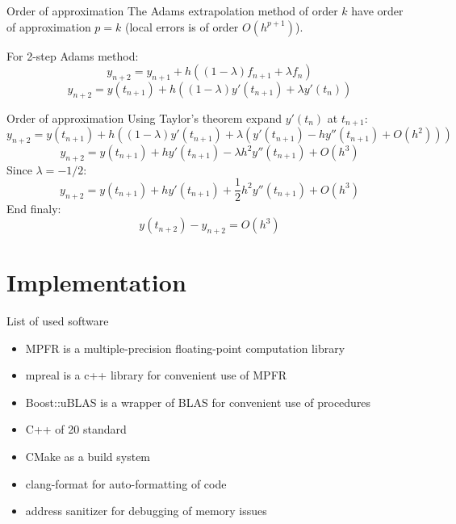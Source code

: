 \documentclass[10pt]{beamer}
\begin{document}
\begin{frame}{Order of approximation}
  The Adams extrapolation method of order $k$ have order of approximation $p = k$ (local errors is of order $O(h^{p+1})$).

  For 2-step Adams method:
  \begin{equation*}
    y_{n+2} = y_{n+1} + h((1-\lambda) f_{n+1} + \lambda f_n)
  \end{equation*}
  \begin{equation*}
    y_{n+2} = y(t_{n+1}) + h((1-\lambda)y'(t_{n+1})+\lambda y'(t_n))
  \end{equation*}
\end{frame}

\begin{frame}{Order of approximation}
  Using Taylor's theorem expand $y'(t_n)$ at $t_{n+1}$:
  \begin{equation*}
      y_{n+2} = y(t_{n+1}) + h((1-\lambda)y'(t_{n+1})+ \lambda (y'(t_{n+1}) - h y''(t_{n+1}) + O(h^2)))
  \end{equation*}
  \begin{equation*}
      y_{n+2} = y(t_{n+1}) + h y'(t_{n+1}) - \lambda h^2 y''(t_{n+1}) + O(h^3)
  \end{equation*}
  Since $\lambda = - 1/2$:
  \begin{equation*}
      y_{n+2} = y(t_{n+1}) + h y'(t_{n+1}) + \frac{1}{2} h^2 y''(t_{n+1}) + O(h^3)
  \end{equation*}
  End finaly:
  \begin{equation*}
    y(t_{n+2}) - y_{n+2} = O(h^3)
  \end{equation*}
\end{frame}

\section{Implementation}

\begin{frame}[fragile]{List of used software}
	\begin{itemize}
        \item MPFR is a multiple-precision floating-point computation library
		\item mpreal is a c++ library for convenient use of MPFR
		\item Boost::uBLAS is a wrapper of BLAS for convenient use of procedures
		\item C++ of 20 standard
		\item CMake as a build system
        \item clang-format for auto-formatting of code
        \item address sanitizer for debugging of memory issues
	\end{itemize}
\end{frame}
\end{document}
